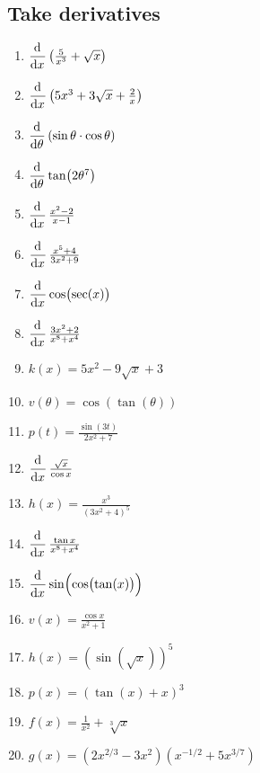 \documentclass[11pt]{scrartcl}
\begin{document}
\subsection{Take derivatives}
\begin{enumerate}
\item $\dod{}{x}\left(\frac{5}{x^3} + \sqrt{x}\right)$
\item $\dod{}{x}\left(5x^3 + 3\sqrt x + \frac{2}{x}\right)$
\item $\dod{}{\theta}(\sin\theta \cdot \cos \theta)$
\item $\dod{}{\theta} \tan(2\theta^7)$
\item $\dod{}{x} \frac{x^2-2}{x-1}$
\item $\dod{}{x} \frac{x^5+4}{3x^2+9}$
\item $\dod{}{x} \cos(\sec(x))$
\item $\dod{}{x} \frac{3x^2 + 2}{x^8 + x^4}$
\item $k(x) = 5x^2 - 9 \sqrt x + 3$
\item $v(\theta) = \cos(\tan(\theta))$
\item $p(t) = \frac{\sin(3t)}{2x^2+7}$
\item $\dod{}{x} \frac{\sqrt x}{\cos x}$
\item $h(x) = \frac{x^3}{(3x^2 + 4)^5}$
\item $\dod{}{x} \frac{\tan x}{x^8 + x^4}$
\item $\dod{}{x} \sin(\cos(\tan(x)))$
\item $v(x) = \frac{\cos x}{x^2 + 1}$
\item $h(x) = \left(\sin(\sqrt x)\right)^5$
\item $p(x)= (\tan(x) + x)^3$
\item $f(x) = \frac{1}{x^2} + \sqrt[3]{x}$
\item $g(x) = (2x^{2/3} - 3x^2)(x^{-1/2} + 5x^{3/7})$
\end{enumerate}
\end{document}
